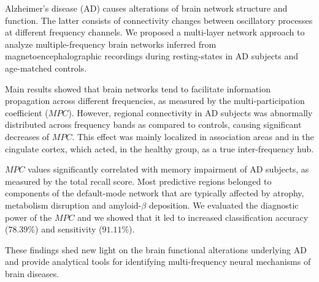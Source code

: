 Alzheimer's disease (AD) causes alterations of brain network structure and function. The latter consists of connectivity changes between oscillatory processes at different frequency channels.
We proposed a multi-layer network approach to analyze multiple-frequency brain networks inferred from magnetoencephalographic recordings during resting-states in AD subjects and age-matched controls. 

Main results showed that brain networks tend to facilitate information propagation across different frequencies, as measured by the multi-participation coefficient ($MPC$).
However, regional connectivity in AD subjects was abnormally distributed across frequency bands as compared to controls, causing significant decreases of $MPC$. This effect was mainly localized in association areas and in the cingulate cortex, which acted, in the healthy group, as a true inter-frequency hub. 

$MPC$ values significantly correlated with memory impairment of AD subjects, as measured by the total recall score. Most predictive regions belonged to components of the default-mode network that are typically affected by atrophy, metabolism disruption and amyloid-$\beta$ deposition. We evaluated the diagnostic power of the $MPC$ and we showed that it led to increased classification accuracy ($78.39\%$) and sensitivity ($91.11\%$).

These findings shed new light on the brain functional alterations underlying AD and provide analytical tools for identifying multi-frequency neural mechanisms of brain diseases.



